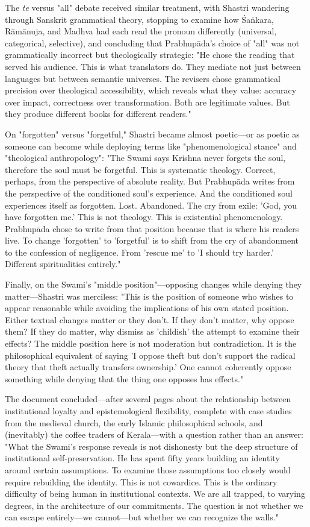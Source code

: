 \documentclass[12pt,twoside]{book}
\begin{document}
The \emph{te} versus "all" debate received similar treatment, with Shastri wandering through Sanskrit grammatical theory, stopping to examine how Śaṅkara, Rāmānuja, and Madhva had each read the pronoun differently (universal, categorical, selective), and concluding that Prabhupāda's choice of "all" was not grammatically incorrect but theologically strategic: "He chose the reading that served his audience. This is what translators do. They mediate not just between languages but between semantic universes. The revisers chose grammatical precision over theological accessibility, which reveals what they value: accuracy over impact, correctness over transformation. Both are legitimate values. But they produce different books for different readers."

On "forgotten" versus "forgetful," Shastri became almost poetic—or as poetic as someone can become while deploying terms like "phenomenological stance" and "theological anthropology": "The Swami says Krishna never forgets the soul, therefore the soul must be forgetful. This is systematic theology. Correct, perhaps, from the perspective of absolute reality. But Prabhupāda writes from the perspective of the conditioned soul's experience. And the conditioned soul experiences itself as forgotten. Lost. Abandoned. The cry from exile: 'God, you have forgotten me.' This is not theology. This is existential phenomenology. Prabhupāda chose to write from that position because that is where his readers live. To change 'forgotten' to 'forgetful' is to shift from the cry of abandonment to the confession of negligence. From 'rescue me' to 'I should try harder.' Different spiritualities entirely."

Finally, on the Swami's "middle position"—opposing changes while denying they matter—Shastri was merciless: "This is the position of someone who wishes to appear reasonable while avoiding the implications of his own stated position. Either textual changes matter or they don't. If they don't matter, why oppose them? If they do matter, why dismiss as 'childish' the attempt to examine their effects? The middle position here is not moderation but contradiction. It is the philosophical equivalent of saying 'I oppose theft but don't support the radical theory that theft actually transfers ownership.' One cannot coherently oppose something while denying that the thing one opposes has effects."

The document concluded—after several pages about the relationship between institutional loyalty and epistemological flexibility, complete with case studies from the medieval church, the early Islamic philosophical schools, and (inevitably) the coffee traders of Kerala—with a question rather than an answer: "What the Swami's response reveals is not dishonesty but the deep structure of institutional self-preservation. He has spent fifty years building an identity around certain assumptions. To examine those assumptions too closely would require rebuilding the identity. This is not cowardice. This is the ordinary difficulty of being human in institutional contexts. We are all trapped, to varying degrees, in the architecture of our commitments. The question is not whether we can escape entirely—we cannot—but whether we can recognize the walls."
\end{document}
